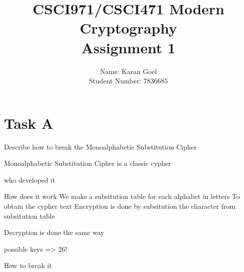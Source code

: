 \documentclass[12pt]{article}
\begin{document}
\title{
    CSCI971/CSCI471 Modern Cryptography \\
    Assignment 1 \\}


\author{
Name: Karan Goel \\
Student Number: 7836685
}



\maketitle



\section{Task A}

Describe how to break the Monoalphabetic Substitution Cipher

Monoalphabetic Substitution Cipher is a classic cypher

who developed it 

How does it work
We make a subsitution table for each alphabet in letters
To obtain the cypher text Encryption is done by subsitution the character from subsitution table

Decryption is done the same way

possible keys => 26!

How to break it
\end{document}
